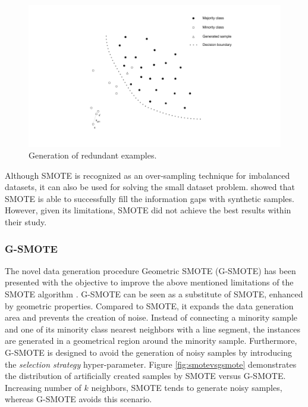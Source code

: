 \documentclass[parskip=full]{scrartcl}
\begin{document}
\begin{figure}[H]
	\centering
	\includegraphics[width=1.0\linewidth]{../analysis/redundant_examples.png}
	\caption{Generation of redundant examples.}
	\label{fig:redundant-examples}
\end{figure}

Although SMOTE is recognized as an over-sampling technique for imbalanced
datasets, it can also be used for solving the small dataset problem.
\cite{Li.2018} showed that SMOTE is able to successfully fill the information
gaps with synthetic samples. However, given its limitations, SMOTE did not
achieve the best results within their study.

\subsubsection{G-SMOTE}

The novel data generation procedure Geometric SMOTE (G-SMOTE) has been presented
with the objective to improve the above mentioned limitations of the SMOTE
algorithm \cite{Douzas.2019}. G-SMOTE can be seen as a substitute of SMOTE,
enhanced by geometric properties. Compared to SMOTE, it expands the data
generation area and prevents the creation of noise. Instead of connecting a
minority sample and one of its minority class nearest neighbors with a line
segment, the instances are generated in a geometrical region around the minority
sample. Furthermore, G-SMOTE is designed to avoid the generation of noisy
samples by introducing the \textit{selection strategy} hyper-parameter. Figure
\ref{fig:smotevsgsmote} demonstrates the distribution of artificially created
samples by SMOTE versus G-SMOTE. Increasing number of \( k \) neighbors, SMOTE
tends to generate noisy samples, whereas G-SMOTE avoids this scenario.
\end{document}
